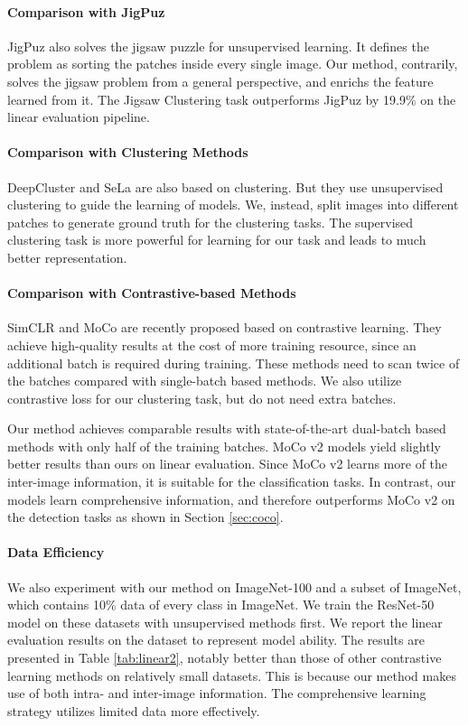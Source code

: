\documentclass[final]{cvpr}
\begin{document}
\paragraph{Comparison with JigPuz} 
JigPuz \cite{jigpuz} also solves the jigsaw puzzle for unsupervised learning. It defines the problem as sorting the patches inside every single image. Our method, contrarily, solves the jigsaw problem from a general perspective, and enrichs the feature learned from it. The Jigsaw Clustering task outperforms JigPuz by 19.9\% on the linear evaluation pipeline.

\paragraph{Comparison with Clustering Methods} 
DeepCluster \cite{deepcluster} and SeLa \cite{sela} are also based on clustering. But they use unsupervised clustering to guide the learning of models. We, instead, split images into different patches to generate ground truth for the clustering tasks. The supervised clustering task is more powerful for learning for our task and leads to much better representation. 

\paragraph{Comparison with Contrastive-based Methods} 
SimCLR \cite{simclr} and MoCo \cite{moco,mocov2} are recently proposed based on contrastive learning. They achieve high-quality results at the cost of more training resource, since an additional batch is required during training. These methods need to scan twice of the batches compared with single-batch based methods. We also utilize contrastive loss for our clustering task, but do not need extra batches. 

Our method achieves comparable results with state-of-the-art dual-batch based methods with only half of the training batches. MoCo v2 models yield slightly better results than ours on linear evaluation. Since MoCo v2 learns more of the inter-image information, it is suitable for the classification tasks. In contrast, our models learn comprehensive information, and therefore outperforms MoCo v2 on the detection tasks as shown in Section \ref{sec:coco}.

\paragraph{Data Efficiency}
We also experiment with our method on ImageNet-100 and a subset of ImageNet, which contains 10\% data of every class in ImageNet.  We train the ResNet-50 model on these datasets with unsupervised methods first. We report the linear evaluation results on the dataset to represent model ability. The results are presented in Table \ref{tab:linear2}, notably better than those of other contrastive learning methods on relatively small datasets. This is because our method makes use of both intra- and inter-image information. The comprehensive learning strategy utilizes limited data more effectively.
\end{document}
